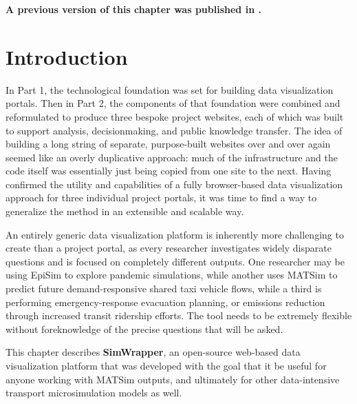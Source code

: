 
\textbf{A previous version of this chapter was published in \cite{CharltonSana2023SimWrapper}.}

\hypertarget{simwrapper-introduction}{%
\section{Introduction}
\label{simwrapper-introduction}}

In Part 1, the technological foundation was set for building data visualization portals. Then in Part 2, the components of that foundation were combined and reformulated to produce three bespoke project websites, each of which was built to support analysis, decisionmaking, and public knowledge transfer. The idea of building a long string of separate, purpose-built websites over and over again seemed like an overly duplicative approach: much of the infrastructure and the code itself was essentially just being copied from one site to the next. Having confirmed the utility and capabilities of a fully browser-based data visualization approach for three individual project portals, it was time to find a way to generalize the method in an extensible and scalable way.

An entirely generic data visualization platform is inherently more challenging to create than a project portal, as every researcher investigates widely disparate questions and is focused on completely different outputs. One researcher may be using EpiSim to explore pandemic simulations, while another uses MATSim to predict future demand-responsive shared taxi vehicle flows, while a third is performing emergency-response evacuation planning, or emissions reduction through increased transit ridership efforts. The tool needs to be extremely flexible without foreknowledge of the precise questions that will be asked.

This chapter describes \textbf{SimWrapper}, an open-source web-based data visualization platform that was developed with the goal that it be useful for anyone working with MATSim outputs, and ultimately for other data-intensive transport microsimulation models as well.


